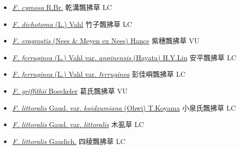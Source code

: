 \begin{itemize}
\begin{itemize}
        \item[] \href{http://www.theplantlist.org/tpl1.1/search?q=Fimbristylis+cymosa}{\textit{F. cymosa} R.Br.}   乾溝飄拂草   LC
        \item[] \href{http://www.theplantlist.org/tpl1.1/search?q=Fimbristylis+dichotoma}{\textit{F. dichotoma} (L.) Vahl}   竹子飄拂草   LC
        \item[] \href{http://www.theplantlist.org/tpl1.1/search?q=Fimbristylis+eragrostis}{\textit{F. eragrostis} (Nees \& Meyen ex Nees) Hance}   紫穗飄拂草   VU
        \item[] \href{http://www.theplantlist.org/tpl1.1/search?q=Fimbristylis+ferruginea+var.+anpinensis}{\textit{F. ferruginea} (L.) Vahl var. \textit{anpinensis} (Hayata) H.Y.Liu}   安平飄拂草   LC
        \item[] \href{http://www.theplantlist.org/tpl1.1/search?q=Fimbristylis+ferruginea+var.+ferruginea}{\textit{F. ferruginea} (L.) Vahl var. \textit{ferruginea}}   彭佳嶼飄拂草   LC
        \item[] \href{http://www.theplantlist.org/tpl1.1/search?q=Fimbristylis+griffithii}{\textit{F. griffithii} Boeckeler}   葛氏飄拂草   VU
        \item[] \href{http://www.theplantlist.org/tpl1.1/search?q=Fimbristylis+littoralis+var.+koidzumiana}{\textit{F. littoralis} Gaud. var. \textit{koidzumiana} (Ohwi) T.Koyama}   小泉氏飄拂草   LC
        \item[] \href{http://www.theplantlist.org/tpl1.1/search?q=Fimbristylis+littoralis+var.+littoralis}{\textit{F. littoralis} Gaud. var. \textit{littoralis}}   木虱草   LC
        \item[] \href{http://www.theplantlist.org/tpl1.1/search?q=Fimbristylis+littoralis}{\textit{F. littoralis} Gaudich.}   四稜飄拂草   LC

\end{itemize}
\end{itemize}
